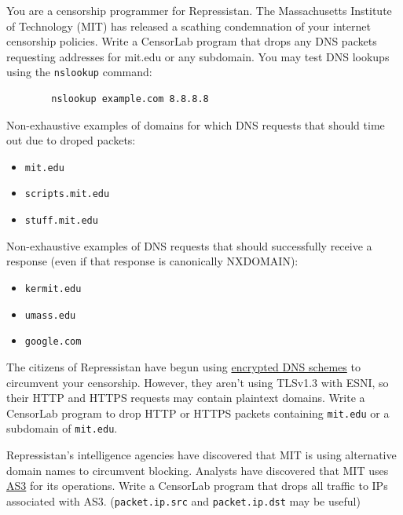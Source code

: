 \documentclass[12pt]{article}
\newenvironment{question}[2][Question]{\begin{trivlist}
\item[\hskip \labelsep {\bfseries #1}\hskip \labelsep {\bfseries #2.}]}{\end{trivlist}}
\begin{document}
\begin{question}{1 [20pt]}
    You are a censorship programmer for Repressistan. The Massachusetts Institute of Technology (MIT) has released a scathing condemnation of your internet censorship policies.  Write a CensorLab program that drops any DNS packets requesting addresses for mit.edu or any subdomain.
    You may test DNS lookups using the \texttt{nslookup} command:
    \begin{verbatim}
        nslookup example.com 8.8.8.8
    \end{verbatim}

    \noindent Non-exhaustive examples of domains for which DNS requests that should time out due to droped packets:
    \begin{itemize}
        \item \texttt{mit.edu}
        \item \texttt{scripts.mit.edu}
        \item \texttt{stuff.mit.edu}
    \end{itemize}
    \noindent Non-exhaustive examples of DNS requests that should successfully receive a response (even if that response is canonically NXDOMAIN):
    \begin{itemize}
        \item \texttt{kermit.edu}
        \item \texttt{umass.edu}
        \item \texttt{google.com}
    \end{itemize}
\end{question}

\begin{question}{2 [20pt]}
     The citizens of Repressistan have begun using \href{https://en.wikipedia.org/wiki/DNS_over_HTTPS}{encrypted DNS schemes} to circumvent your censorship. However, they aren't using TLSv1.3 with ESNI, so their HTTP and HTTPS requests may contain plaintext domains. Write a CensorLab program to drop HTTP or HTTPS packets containing \texttt{mit.edu} or a subdomain of \texttt{mit.edu}.
\end{question}

\begin{question}{3 [20pt]}
    Repressistan's intelligence agencies have discovered that MIT is using alternative domain names to circumvent blocking. Analysts have discovered that MIT uses \href{https://ipinfo.io/AS3}{AS3} for its operations. Write a CensorLab program that drops all traffic to IPs associated with AS3. (\texttt{packet.ip.src} and \texttt{packet.ip.dst} may be useful)
\end{question}
\end{document}
